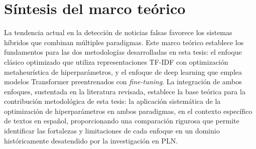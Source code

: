 \section{Síntesis del marco teórico}
\label{sec:sintesis_marco}

La tendencia actual en la detección de noticias falsas favorece los sistemas híbridos que combinan múltiples paradigmas. Este marco teórico establece los fundamentos para las dos metodologías desarrolladas en esta tesis: el enfoque clásico optimizado que utiliza representaciones TF-IDF con optimización metaheurística de hiperparámetros, y el enfoque de deep learning que emplea modelos Transformer preentrenados con \textit{fine-tuning}. La integración de ambos enfoques, sustentada en la literatura revisada, establece la base teórica para la contribución metodológica de esta tesis: la aplicación sistemática de la optimización de hiperparámetros en ambos paradigmas, en el contexto específico de textos en español, proporcionando una comparación rigurosa que permite identificar las fortalezas y limitaciones de cada enfoque en un dominio históricamente desatendido por la investigación en PLN.